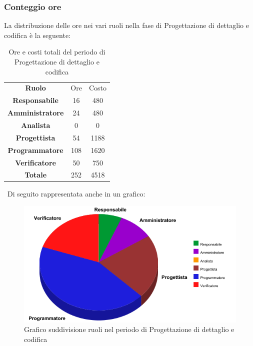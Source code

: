\subsubsection{Conteggio ore}
	La distribuzione delle ore nei vari ruoli nella fase di Progettazione di dettaglio e codifica è la seguente:
	
\begin{table}[!htpb]
		\centering
	\renewcommand{\arraystretch}{1.8} 
	\begin{tabular}{| c c c|}
		\rowcolor{orange!50}
		\hline
		\multicolumn{3}{|c|}{\textbf{Suddivisione delle ore nei vari ruoli}}\\
		\hline
		\textbf{Ruolo} 			& Ore 	& Costo\\
		\hline
		\textbf{Responsabile}	&16		&480\\
		\hline
		\textbf{Amministratore}	&24		&480\\
		\hline
		\textbf{Analista}		&0		&0\\
		\hline
		\textbf{Progettista}	&54		&1188\\
		\hline
		\textbf{Programmatore}	&108	&1620\\
		\hline
		\textbf{Verificatore} 	&50		&750\\
		\hline
		\textbf{Totale} 		&252	&4518\\
		\hline 
	\end{tabular}
	\caption{Ore e costi totali del periodo di Progettazione di dettaglio e codifica}
\end{table}
	~\newline Di seguito rappresentata anche in un grafico:
\begin{figure}[!htpb]
	\centering
	\includegraphics[scale=0.7]{preventivo/torta_terza_parte.png}
	\caption{Grafico suddivisione ruoli nel periodo di Progettazione di dettaglio e codifica}
\end{figure}
\clearpage
